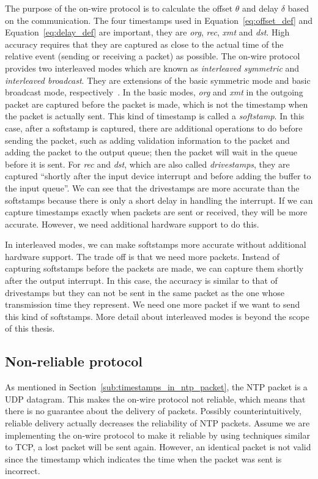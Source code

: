 The purpose of the on-wire protocol is to calculate the offset $\theta$ and
delay $\delta$ based on the communication. The four timestamps used in
Equation~\ref{eq:offset_def} and Equation~\ref{eq:delay_def} are important,
they are \emph{org}, \emph{rec}, \emph{xmt} and \emph{dst}.  High accuracy
requires that they are captured as close to the actual time of the relative
event (sending or receiving a packet) as possible. The on-wire protocol
provides two interleaved modes which are known as \emph{interleaved symmetric}
and \emph{interleaved broadcast}. They are extensions of the basic symmetric
mode and basic broadcast mode, respectively~\cite{on_wire}.
%
In the basic modes, \emph{org} and \emph{xmt} in the outgoing packet are
captured before the packet is made, which is not the timestamp when the packet
is actually sent. 
This kind of timestamp is called a \emph{softstamp}. In this case, 
after a softstamp is captured, there are additional operations to do before
sending the packet, such as adding validation information to the packet and
adding the packet to the output queue; then the packet will wait in the queue
before it is sent.  For \emph{rec} and \emph{dst}, which are also called
\emph{drivestamps}, they are captured ``shortly after the input device
interrupt and before adding the buffer to the input queue''\cite{on_wire}. We
can see that the drivestamps are more accurate than the softstamps because
there is only a short delay in handling the interrupt. If we can capture
timestamps exactly when packets are sent or received, they will be more
accurate. However, we need additional hardware support to do this.

In interleaved modes, we can make softstamps more accurate without
additional hardware support. The trade off is that we need more packets.
Instead of capturing softstamps before the packets are made, we can capture
them shortly after the output interrupt. In this case, the accuracy is similar
to that of drivestamps but they can not be sent in the same packet as the one
whose transmission time they represent. We need one more packet if we want to
send this kind of softstamps. More detail about interleaved modes is beyond
the scope of this thesis.

\subsection{Non-reliable protocol}%
\label{sub:non_reliable_protocol}
As mentioned in Section~\ref{sub:timestamps_in_ntp_packet}, the NTP packet is a
UDP datagram. This makes the on-wire protocol not reliable, which means that
there is no guarantee about the delivery of packets. Possibly
counterintuitively, reliable delivery actually
decreases the reliability of NTP packets. Assume we are implementing the
on-wire protocol to make it reliable by using techniques similar to TCP, a lost
packet will be sent again. However, an identical packet is not valid since the
timestamp which indicates the time when the packet was sent is incorrect.

